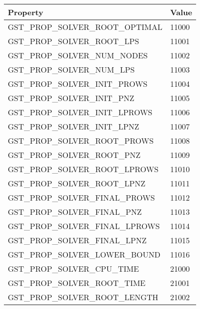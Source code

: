 \begin{tabular}{|l|l|}
\hline
Property & Value \\
\hline
GST\_PROP\_SOLVER\_ROOT\_OPTIMAL & 11000 \\
GST\_PROP\_SOLVER\_ROOT\_LPS & 11001 \\
GST\_PROP\_SOLVER\_NUM\_NODES & 11002 \\
GST\_PROP\_SOLVER\_NUM\_LPS & 11003 \\
GST\_PROP\_SOLVER\_INIT\_PROWS & 11004 \\
GST\_PROP\_SOLVER\_INIT\_PNZ & 11005 \\
GST\_PROP\_SOLVER\_INIT\_LPROWS & 11006 \\
GST\_PROP\_SOLVER\_INIT\_LPNZ & 11007 \\
GST\_PROP\_SOLVER\_ROOT\_PROWS & 11008 \\
GST\_PROP\_SOLVER\_ROOT\_PNZ & 11009 \\
GST\_PROP\_SOLVER\_ROOT\_LPROWS & 11010 \\
GST\_PROP\_SOLVER\_ROOT\_LPNZ & 11011 \\
GST\_PROP\_SOLVER\_FINAL\_PROWS & 11012 \\
GST\_PROP\_SOLVER\_FINAL\_PNZ & 11013 \\
GST\_PROP\_SOLVER\_FINAL\_LPROWS & 11014 \\
GST\_PROP\_SOLVER\_FINAL\_LPNZ & 11015 \\
GST\_PROP\_SOLVER\_LOWER\_BOUND & 11016 \\
GST\_PROP\_SOLVER\_CPU\_TIME & 21000 \\
GST\_PROP\_SOLVER\_ROOT\_TIME & 21001 \\
GST\_PROP\_SOLVER\_ROOT\_LENGTH & 21002 \\
\hline
\end{tabular}
